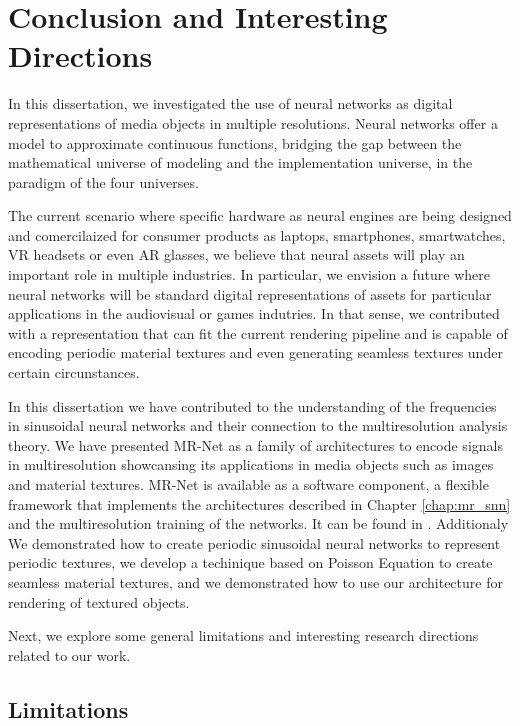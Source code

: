 \chapter{Conclusion and Interesting Directions}
\label{chap:future}

In this dissertation, we investigated the use of neural networks as digital representations of media objects in multiple resolutions. Neural networks offer a model to approximate continuous functions, bridging the gap between the mathematical universe of modeling and the implementation universe, in the paradigm of the four universes. 

The current scenario where specific hardware as neural engines are being designed and comercilaized for consumer products as laptops, smartphones, smartwatches, VR headsets or even AR glasses, we believe that neural assets will play an important role in multiple industries.  In particular, we envision a future where neural networks will be standard digital representations of assets for particular applications in the audiovisual or games indutries. In that sense, we contributed with a representation that can fit the current rendering pipeline and is capable of encoding periodic material textures and even generating seamless textures under certain circunstances.


In this dissertation we have contributed to the understanding of the frequencies in sinusoidal neural networks and their connection to the multiresolution analysis theory. We have presented MR-Net as a family of architectures to encode signals in multiresolution showcansing its applications in media objects such as images and material textures. MR-Net is available as a software component, a flexible framework that implements the architectures described in Chapter \ref{chap:mr_snn} and the multiresolution training of the networks. It can be found in \cite{mrnetGithub}. Additionaly We demonstrated how to create periodic sinusoidal neural networks to represent periodic textures, we develop a techinique based on Poisson Equation to create seamless material textures, and we demonstrated how to use our architecture for rendering of textured objects.

Next, we explore some general limitations and interesting research directions related to our work.


\section{Limitations}

